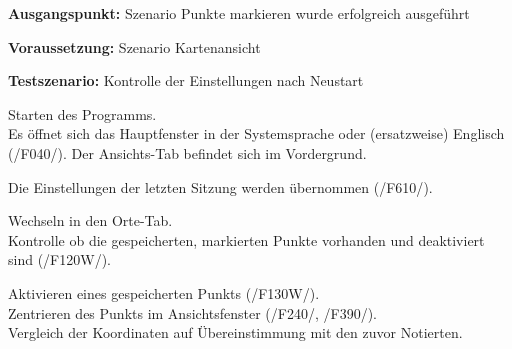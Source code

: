 \documentclass[10pt]{scrreprt}
\newcommand{\sfbf}[1]{\textbf{\sffamily #1}}
\newcommand{\ziel}[1]{{\fontsize{9.5}{11}\textsf{/#1/}}}
\newenvironment{details}[1][6pt]{%
  \parskip#1 \parindent6mm \raggedright%
  \def\item{\par\ignorespaces\hangindent=5mm \hangafter1}}{%
  \par\ignorespaces}
\begin{document}
\vspace{1.0cm}
\begin{details}[2pt]
\item \sfbf{Ausgangspunkt:} Szenario Punkte markieren wurde erfolgreich ausgeführt
\item \sfbf{Voraussetzung:} Szenario Kartenansicht
\item \sfbf{Testszenario:} Kontrolle der Einstellungen nach Neustart
\end{details}
\vspace{2mm}
\begin{enumerate}[leftmargin = 2.2cm, resume]
\item Starten des Programms.\\Es öffnet sich das Hauptfenster in der Systemsprache oder (ersatzweise) Englisch (\ziel{F040}). Der Ansichts-Tab befindet sich im Vordergrund.
\item Die Einstellungen der letzten Sitzung werden übernommen (\ziel{F610}).
\item Wechseln in den Orte-Tab.\\Kontrolle ob die gespeicherten, markierten Punkte vorhanden und deaktiviert sind (\ziel{F120W}).
\item Aktivieren eines gespeicherten Punkts (\ziel{F130W}).\\Zentrieren des Punkts im Ansichtsfenster (\ziel{F240}, \ziel{F390}).\\Vergleich der Koordinaten auf Übereinstimmung mit den zuvor Notierten.
\end{enumerate}
\end{document}
